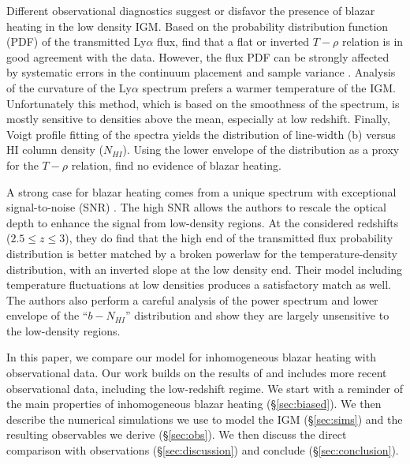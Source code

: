 \documentclass[numberedappendix]{emulateapj}
\newcommand\ALc[1]{{\color{red} \bf #1}} %
\begin{document}
Different observational diagnostics suggest or disfavor the presence of blazar heating in the low density IGM. Based on the probability distribution function (PDF) of the transmitted Ly$\alpha$ flux, \citet{2007MNRAS.382.1657K,2008MNRAS.386.1131B,2009MNRAS.399L..39V,2012MNRAS.422.3019C} find that a flat or inverted  $T-\rho$ relation is in good agreement with the data. However, the flux PDF can be strongly affected by systematic errors in the continuum placement \citep{2012ApJ...753..136L} and sample variance \citep{2013MNRAS.428..540R}. Analysis of the curvature of the Ly$\alpha$ spectrum \citep{2011MNRAS.410.1096B,2014MNRAS.441.1916B} prefers a warmer temperature of the IGM. Unfortunately this method, which is based on the smoothness of the spectrum, is mostly sensitive to densities above the mean, especially at low redshift. Finally, Voigt profile fitting of the spectra yields the distribution of line-width (b) versus HI column density ($N_{HI}$). Using the lower envelope of the distribution as a proxy for the $T-\rho$ relation, \citet{2012ApJ...757L..30R,2014MNRAS.438.2499B,2017MNRAS.464..897B} find no evidence of blazar heating.

A strong case for blazar heating comes from a unique spectrum with exceptional signal-to-noise  (SNR) \citep{2017MNRAS.466.2690R}.  The high SNR allows the authors to rescale the optical depth to enhance the signal from low-density regions. At the considered redshifts ($2.5\leq z \leq 3$), they do find that the 
high end of the transmitted flux probability distribution is better matched by a broken powerlaw for the temperature-density distribution, with an inverted slope at the low density end. Their model including temperature fluctuations at low densities produces a satisfactory match as well. The authors also perform a careful analysis of the power spectrum and lower envelope of the ``$b-N_{HI}$'' distribution and show they are largely  unsensitive to the low-density regions. 



In this paper, we compare our model for inhomogeneous blazar heating with observational data. Our work builds on the results of \citet{2012MNRAS.423..149P} and includes more recent observational data, including the low-redshift regime.  We start with a reminder of the main properties of inhomogeneous blazar heating (\S\ref{sec:biased}). We then describe the numerical simulations we use to model the IGM (\S\ref{sec:sims}) and the resulting observables we derive (\S\ref{sec:obs}). We then discuss the direct comparison with observations (\S\ref{sec:discussion}) and conclude (\S\ref{sec:conclusion}).
\end{document}
